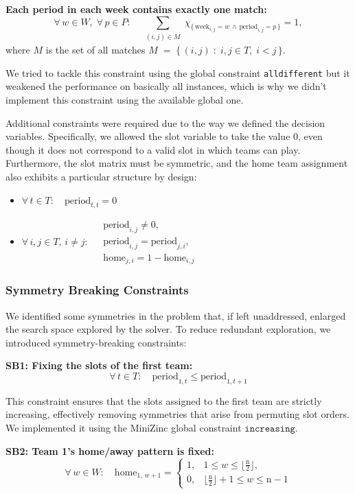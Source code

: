 \textbf{Each period in each week contains exactly one match:}
\[
\forall\, w \in W,\;
\forall\, p \in P:\quad
\sum_{\substack{(i,j) \in M}}
\chi_{\{\,\text{week}_{i,j} = w \,\wedge\, \text{period}_{i,j} = p\,\}} = 1,
\]
where $M$ is the set of all matches $M \;=\; \bigl\{\,(i,j) \;:\; i,j \in T,\; i<j \,\bigr\}.$

We tried to tackle this constraint using the global constraint \texttt{alldifferent} but it weakened the performance on basically all instances, which is why we didn't implement this constraint using the available global one.

Additional constraints were required due to the way we defined the decision variables. Specifically, we allowed the slot variable to take the value $0$, even though it does not correspond to a valid slot in which teams can play. Furthermore, the slot matrix must be symmetric, and the home team assignment also exhibits a particular structure by design:
\begin{itemize}
    \item $\forall\, t \in T:\quad \text{period}_{t,t} = 0$
    \item  $\forall\, i,j \in T,\, i \ne j:\;
\begin{aligned}
& \text{period}_{i,j} \ne 0,\\
& \text{period}_{i,j} = \text{period}_{j,i},\\
& \text{home}_{j,i} = 1 - \text{home}_{i,j}
\end{aligned}$
\end{itemize}

\subsubsection*{Symmetry Breaking Constraints}
We identified some symmetries in the problem that, if left unaddressed,  enlarged the search space explored by the solver. To reduce redundant exploration, we introduced symmetry-breaking constraints:

\textbf{SB1: Fixing the slots of the first team:}
\[
\forall\, t \in T:\quad \text{period}_{1,t} \le \text{period}_{1,t+1}
\]

This constraint ensures that the slots assigned to the first team are strictly increasing, effectively removing symmetries that arise from permuting slot orders. We implemented it using the MiniZinc global constraint $\mathtt{increasing}.$

\textbf{SB2: Team 1's home/away pattern is fixed:}
\[
\forall\, w \in W:\quad
\text{home}_{1,\, w+1} =
\begin{cases}
1, & 1 \le w \le \lfloor \tfrac{\text{n}}{2} \rfloor,\\[2mm]
0, & \lfloor \tfrac{\text{n}}{2} \rfloor + 1 \le w \le \text{n}-1
\end{cases}
\]

